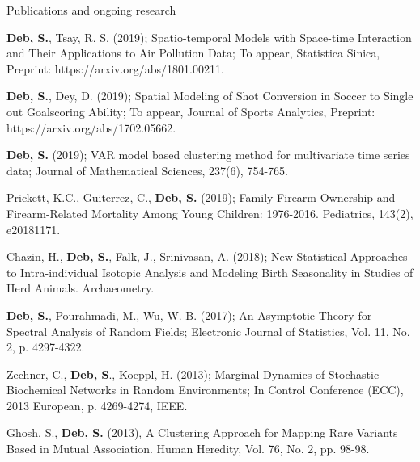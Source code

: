 \documentclass{resume} %
\begin{document}
\begin{rSection}{Publications and ongoing research}
\begin{rSubsection}{}{}{}{}
    \item {\bf Deb, S.}, Tsay, R. S. (2019); Spatio-temporal Models with Space-time Interaction and Their Applications to Air Pollution Data; To appear, Statistica Sinica, Preprint: https://arxiv.org/abs/1801.00211.
    \item {\bf Deb, S.}, Dey, D. (2019); Spatial Modeling of Shot Conversion in Soccer to Single out Goalscoring Ability; To appear, Journal of Sports Analytics, Preprint: https://arxiv.org/abs/1702.05662.
    \item {\bf Deb, S.} (2019); VAR model based clustering method for multivariate time series data; Journal of Mathematical Sciences, 237(6), 754-765.
     \item Prickett, K.C., Guiterrez, C., {\bf Deb, S.} (2019); Family Firearm Ownership and Firearm-Related Mortality Among Young Children: 1976-2016. Pediatrics, 143(2), e20181171.
    \item Chazin, H., {\bf Deb, S.}, Falk, J., Srinivasan, A. (2018); New Statistical Approaches to Intra-individual Isotopic Analysis and Modeling Birth Seasonality in Studies of Herd Animals. Archaeometry.      
     \item {\bf Deb, S.}, Pourahmadi, M., Wu, W. B. (2017); An Asymptotic Theory for Spectral Analysis of Random Fields;  Electronic Journal of Statistics, Vol. 11, No. 2, p. 4297-4322.
    \item Zechner, C., {\bf Deb, S}., Koeppl, H. (2013); Marginal Dynamics of Stochastic Biochemical Networks in Random Environments; In Control Conference (ECC), 2013 European, p. 4269-4274, IEEE.
    \item Ghosh, S., {\bf Deb, S.} (2013), A Clustering Approach for Mapping Rare Variants Based in Mutual Association. Human Heredity, Vol. 76, No. 2, pp. 98-98. 
\end{rSubsection}
\end{rSection}
\end{document}
